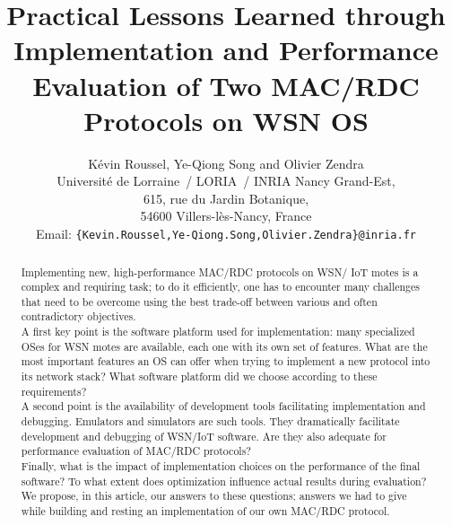 \documentclass[12pt,a4paper]{article}
\begin{document}


\title{Practical Lessons Learned through Implementation and Performance
       Evaluation of Two MAC/RDC Protocols on WSN OS}

\author{
K\'evin Roussel, Ye-Qiong Song and Olivier Zendra\\
Universit\'e de Lorraine~/ LORIA~/ INRIA Nancy Grand-Est,\\
615, rue du Jardin Botanique,\\
54600 Villers-l\`es-Nancy, France\\
Email: \texttt{\{Kevin.Roussel,Ye-Qiong.Song,Olivier.Zendra\}@inria.fr}
}

\date{}

\maketitle

\begin{abstract}
Implementing new, high-performance MAC/RDC protocols on WSN/ IoT motes
is a complex and requiring task; to do it efficiently, one has to encounter
many challenges that need to be overcome using the best trade-off between
various and often contradictory objectives.\\
A first key point is the software platform used for implementation: many
specialized OSes for WSN motes are available, each one with its own set
of features. What are the most important features an OS can offer when
trying to implement a new protocol into its network stack? What software
platform did we choose according to these requirements?\\
A second point is the availability of development tools facilitating
implementation and debugging. Emulators and simulators are such tools.
They dramatically facilitate development and debugging of WSN/IoT
software. Are they also adequate for performance evaluation
of MAC/RDC protocols?\\
Finally, what is the impact of implementation choices on the performance
of the final software? To what extent does optimization influence
actual results during evaluation?\\
We propose, in this article, our answers to these questions; answers we had
to give while building and resting an implementation of our own MAC/RDC
protocol.
\end{abstract}
\end{document}
